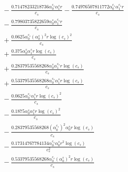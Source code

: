 \documentclass[10pt]{article}
\begin{document}
\begin{align*}
&{}  - \frac{0.71478233218736 \alpha_{0}^{c_s} \alpha_{1}^s r}{c_{s}} - \frac{0.74976507811772 \alpha_{0}^{c_s} \alpha_{1}^{c_s} r}{c_{s}} \\
&{}  - \frac{0.79803735822659 \alpha_{0}^s \alpha_{1}^{c_s} r}{c_{s}} \\
&{}  + \frac{0.0625 \alpha_{0}^{c_s} \left(\alpha_{0}^s\right)^{2} r \log{\left(c_{s} \right)}^{2}}{c_{s}} \\
&{}  + \frac{0.375 \alpha_{0}^s \alpha_{1}^s r \log{\left(c_{s} \right)}}{c_{s}} \\
&{}  + \frac{0.28379535568268 \alpha_{0}^s \alpha_{1}^{c_s} r \log{\left(c_{s} \right)}}{c_{s}} \\
&{}  + \frac{0.53379535568268 \alpha_{0}^{c_s} \alpha_{1}^s r \log{\left(c_{s} \right)}}{c_{s}} \\
&{}  - \frac{0.0625 \alpha_{0}^{c_s} \alpha_{1}^s r \log{\left(c_{s} \right)}^{2}}{c_{s}} \\
&{}  - \frac{0.1875 \alpha_{0}^s \alpha_{1}^s r \log{\left(c_{s} \right)}^{2}}{c_{s}} \\
&{}  - \frac{0.28379535568268 \left(\alpha_{0}^{c_s}\right)^{2} \alpha_{0}^s r \log{\left(c_{s} \right)}}{c_{s}} \\
&{}  - \frac{0.17314767784134 \alpha_{0}^{c_s} \alpha_{0}^s r^{2} \log{\left(c_{s} \right)}}{c_{s}^{2}} \\
&{}  - \frac{0.53379535568268 \alpha_{0}^{c_s} \left(\alpha_{0}^s\right)^{2} r \log{\left(c_{s} \right)}}{c_{s}}
\end{align*}
\end{document}
